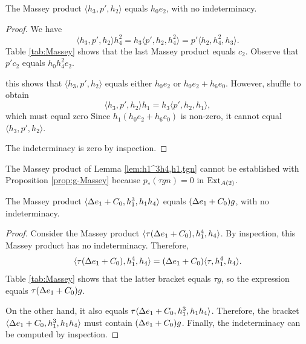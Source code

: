 \begin{lemma}
\label{lem:h3,p',h2}
The Massey product $\langle h_3, p', h_2 \rangle$ equals
$h_0 e_2$, with no indeterminacy.
\end{lemma}

\begin{proof}
We have
\[
\langle h_3, p', h_2 \rangle h_4^2 = 
h_3 \langle p', h_2, h_4^2 \rangle = 
p' \langle h_2, h_4^2, h_3 \rangle.
\]
Table \ref{tab:Massey} shows that the last Massey product
equals $c_2$.
Observe that $p' c_2$ equals $h_0 h_4^2 e_2$.

this shows that $\langle h_3, p', h_2 \rangle$ equals
either $h_0 e_2$ or $h_0 e_2 + h_6 e_0$.
However, shuffle to obtain
\[
\langle h_3, p', h_2 \rangle h_1 = 
h_3 \langle p', h_2, h_1 \rangle,
\]
which must equal zero
Since $h_1(h_0 e_2 + h_6 e_0)$ is non-zero, it cannot equal
$\langle h_3, p', h_2 \rangle$.

The indeterminacy is zero by inspection.
\end{proof}

\begin{remark}
\label{rem:h1^3h4,h1,tgn}
The Massey product of Lemma \ref{lem:h1^3h4,h1,tgn}
cannot be established with Proposition \ref{prop:g-Massey}
because $p_*(\tau g n) = 0$ in $\operatorname{Ext}_{A(2)}$.
\end{remark}

\begin{lemma}
\label{lem:De1+C0,h1^3,h1h4}
The Massey product $\langle \Delta e_1 + C_0, h_1^3, h_1 h_4 \rangle$
equals $(\Delta e_1 + C_0) g$, with no indeterminacy.
\end{lemma}

\begin{proof}
Consider the Massey product
$\langle \tau (\Delta e_1 + C_0), h_1^4, h_4 \rangle$.
By inspection, this Massey product has no indeterminacy. 
Therefore,
\[
\langle \tau (\Delta e_1 + C_0), h_1^4, h_4 \rangle =
(\Delta e_1 + C_0) \langle \tau, h_1^4, h_4 \rangle.
\]
Table \ref{tab:Massey} shows that the latter bracket equals $\tau g$,
so the expression equals $\tau (\Delta e_1 + C_0) g$.

On the other hand, it also equals
$\tau \langle \Delta e_1 + C_0, h_1^3, h_1 h_4 \rangle$.
Therefore, the bracket
$\langle \Delta e_1 + C_0, h_1^3, h_1 h_4 \rangle$ must contain
$(\Delta e_1 + C_0) g$.  Finally, the indeterminacy can be computed
by inspection.
\end{proof}


